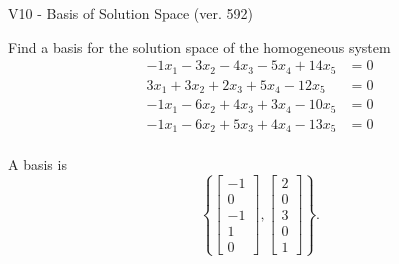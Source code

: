 \begin{exercise}
  \begin{exerciseTitle}V10 - Basis of Solution Space (ver. 592)\end{exerciseTitle}
  \begin{exerciseStatement}
    Find a basis for the solution space of the homogeneous system 
\begin{align*}
 -1 x_ 1 -3 x_ 2 -4 x_ 3 -5 x_ 4 + 14 x_ 5 &= 0  \\ 
  3 x_ 1 + 3 x_ 2 + 2 x_ 3 + 5 x_ 4 -12 x_ 5 &= 0  \\ 
  -1 x_ 1 -6 x_ 2 + 4 x_ 3 + 3 x_ 4 -10 x_ 5 &= 0  \\ 
  -1 x_ 1 -6 x_ 2 + 5 x_ 3 + 4 x_ 4 -13 x_ 5 &= 0  \\ 
 \end{align*}


 
  \end{exerciseStatement}

  \begin{exerciseAnswer}
   A basis is   
\[\left\{\left[\begin{array}{c}
-1 \\
0 \\
-1 \\
1 \\
0
\end{array}\right] , \left[\begin{array}{c}
2 \\
0 \\
3 \\
0 \\
1
\end{array}\right]\right\}.\]

  


  \end{exerciseAnswer}
\end{exercise}
